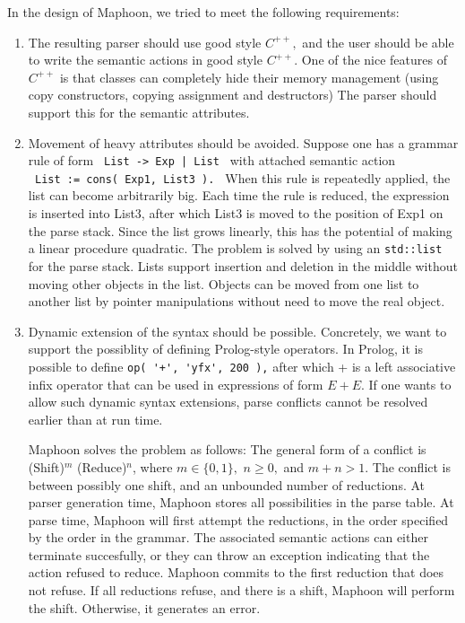 \documentclass{article}
\begin{document}
\noindent
In the design of Maphoon, we tried to meet the following requirements:
\begin{enumerate}
\item
   The resulting parser should use good style $ C^{++}, $ 
   and the user should be able to write the semantic actions in good style 
   $ C^{++}. $ 
   One of the nice features of $ C^{++} $ is that classes can 
   completely hide their memory management (using copy constructors,
   copying assignment and destructors)
   The parser should support this for the semantic attributes.
\item
   Movement of heavy attributes should be avoided. Suppose one has a 
   grammar rule of form \verb+ List -> Exp | List + with attached 
   semantic action \\
   \verb+ List := cons( Exp1, List3 ). +
   When this rule is repeatedly applied, the list can become arbitrarily big. 
   Each time the rule is reduced,  
   the expression is inserted into List3, after which List3
   is moved to the position of Exp1 on the parse stack. 
   Since the list grows linearly, this has the potential of making
   a linear procedure quadratic.
   The problem is solved by using an \verb+std::list+ for the parse stack. 
   Lists support insertion and deletion in the middle without 
   moving other objects in the list. Objects can be moved from one
   list to another list by pointer manipulations without need to move
   the real object. 
\item
   Dynamic extension of the syntax should be possible. Concretely,
   we want to support the possiblity of defining Prolog-style operators.
   In Prolog, it is possible to define \verb&op( '+', 'yfx', 200 ),& 
   after which + is a left associative infix operator that can be used 
   in expressions of form $ E + E. $ 
   If one wants to allow such dynamic syntax extensions, parse 
   conflicts cannot be resolved earlier than at run time. 
   
   \noindent
   Maphoon solves the problem as follows: The general form of a conflict
   is (Shift)$^m$ (Reduce)$^n$, where $ m \in \{ 0, 1 \}, $ 
   $ n \geq 0, $ and $ m+n > 1. $
   The conflict is between possibly one shift,
   and an unbounded number of reductions. At parser generation time,
   Maphoon stores all possibilities in the parse table.
   At parse time, Maphoon will first attempt the reductions,
   in the order specified by the order in the grammar. The associated
   semantic actions can either terminate succesfully, or they can throw an
   exception indicating that the action refused to reduce.
   Maphoon commits to the first reduction that does not refuse. 
   If all reductions refuse, and there is a shift, Maphoon will
   perform the shift. Otherwise, it generates an error.


\end{enumerate}
\end{document}
